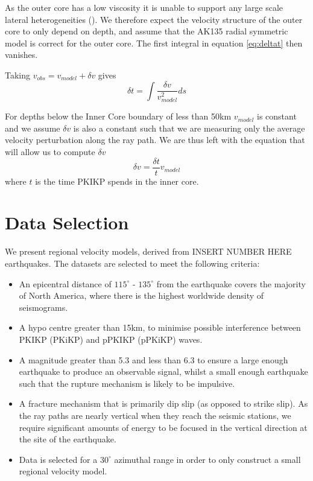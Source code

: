 \documentclass[11pt,a4paper]{article}
\begin{document}
As the outer core has a low viscosity it is unable to support any large scale lateral heterogeneities (\cite{Wijs1998}). We therefore expect the velocity structure of the outer core to only depend on depth, and assume that the AK135 radial symmetric model is correct for the outer core. The first integral in equation \eqref{eq:deltat} then vanishes.

Taking $v_{obs} = v_{model} + \delta v$ gives
\begin{equation}
	\delta t = \int \frac{\delta v}{v^{2}_{model}} ds
\end{equation}

For depths below the Inner Core boundary of less than 50km $v_{model}$ is constant and we assume $\delta v$ is also a constant such that we are measuring only the average velocity perturbation along the ray path. We are thus left with the equation that will allow us to compute $\delta v$
\begin{equation}
	\delta v = \frac{\delta t}{t} v_{model}
\end{equation}
where $t$ is the time PKIKP spends in the inner core.
\section{Data Selection}

We present regional velocity models, derived from INSERT NUMBER HERE earthquakes. The datasets are selected to meet the following criteria:

\begin{itemize}
	\item An epicentral distance of $115^{\circ}$ - $135^{\circ}$ from the earthquake covers the majority of North America, where there is the highest worldwide density of seismograms.
	\item A hypo centre greater than 15km, to minimise possible interference between PKIKP (PKiKP) and pPKIKP (pPKiKP) waves.
	\item A magnitude greater than 5.3 and less than 6.3 to ensure a large enough earthquake to produce an observable signal, whilst a small enough earthquake such that the rupture mechanism is likely to be impulsive.
	\item A fracture mechanism that is primarily dip slip (as opposed to strike slip). As the ray paths are nearly vertical when they reach the seismic stations, we require significant amounts of energy to be focused in the vertical direction at the site of the earthquake.
	\item Data is selected for a $30^{\circ}$ azimuthal range in order to only construct a small regional velocity model.
\end{itemize}
\end{document}
